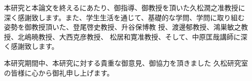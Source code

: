 \documentclass[main]{subfiles}
\begin{document}
\acknowledgment

本研究と本論文を終えるにあたり、御指導、御教授を頂いた久松潤之准教授に
深く感謝致します。また、学生生活を通じて、基礎的な学問、学問に取り組む
姿勢を御教授頂いた、登尾啓史教授、升谷保博教
授、渡邊郁教授、鴻巣敏之教授、北嶋暁教授、大西克彦教授、
松居和寛准教授、そして、中原匡哉講師に深く感謝致します。

本研究期間中、本研究に対する貴重な御意見、御協力を頂きました
久松研究室の皆様に心から御礼申し上げます。
\end{document}
